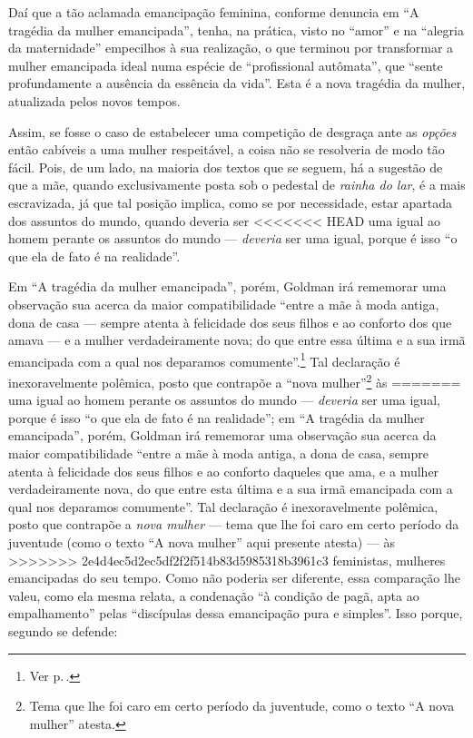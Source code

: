Daí que a tão aclamada emancipação
feminina, conforme denuncia em ``A tragédia da mulher emancipada'',
tenha, na prática, visto no ``amor'' e na ``alegria da maternidade''
empecilhos à sua realização, o que terminou por transformar a mulher
emancipada ideal numa espécie de ``profissional autômata'', que ``sente
profundamente a ausência da essência da vida''. Esta é a nova tragédia
da mulher, atualizada pelos novos tempos. 

Assim, se fosse o caso de
estabelecer uma competição de desgraça ante as \textit{opções} então cabíveis
a uma mulher respeitável, a coisa não se resolveria de modo tão fácil.
Pois, de um lado, na maioria dos textos que se seguem, há a sugestão de
que a mãe, quando exclusivamente posta sob o pedestal de \textit{rainha do
lar}, é a mais escravizada, já que tal posição implica, como se por
necessidade, estar apartada dos assuntos do mundo, quando deveria ser
<<<<<<< HEAD
uma igual ao homem perante os assuntos do mundo --- \emph{deveria} ser
uma igual, porque é isso ``o que ela de fato é na realidade''.

Em ``A
tragédia da mulher emancipada'', porém, Goldman irá rememorar uma
observação sua acerca da maior compatibilidade ``entre a mãe à moda antiga, dona de casa ---
sempre atenta à felicidade dos seus filhos e ao conforto dos que
amava --- e a mulher verdadeiramente nova; do que entre essa última e a sua
irmã emancipada com a qual nos deparamos comumente''.\footnote{Ver p.\,\pageref{mae}.} Tal declaração é inexoravelmente polêmica, posto que
contrapõe a ``nova mulher''\footnote{Tema que lhe foi caro em certo período da
juventude, como o texto ``A nova mulher'' atesta.} às
=======
uma igual ao homem perante os assuntos do mundo --- \textit{deveria} ser
uma igual, porque é isso ``o que ela de fato é na realidade''; em ``A
tragédia da mulher emancipada'', porém, Goldman irá rememorar uma
observação sua acerca da maior compatibilidade ``entre a mãe à moda
antiga, a dona de casa, sempre atenta à felicidade dos seus filhos e ao
conforto daqueles que ama, e a mulher verdadeiramente nova, do que entre
esta última e a sua irmã emancipada com a qual nos deparamos
comumente''. Tal declaração é inexoravelmente polêmica, posto que
contrapõe a \textit{nova mulher} --- tema que lhe foi caro em certo período da
juventude (como o texto ``A nova mulher'' aqui presente atesta) --- às
>>>>>>> 2e4d4ec5d2ec5df2f2f514b83d5985318b3961c3
feministas, mulheres emancipadas do seu tempo. Como não poderia ser
diferente, essa comparação lhe valeu, como ela mesma relata, a condenação
``à condição de pagã,
apta ao empalhamento'' pelas ``discípulas dessa emancipação pura e
simples''. Isso porque, segundo se defende:

